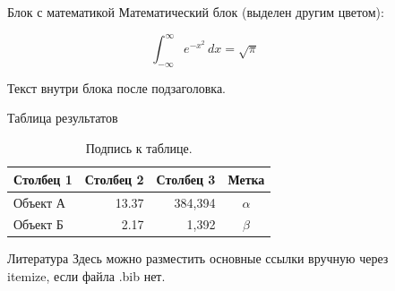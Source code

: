 \documentclass[final]{beamer}
\newlength{\sepwidth}
\newlength{\colwidth}
\newcommand{\separatorcolumn}{\begin{column}{\sepwidth}\end{column}}
\begin{document}
\begin{frame}[t]
\begin{columns}[t]
\begin{column}{\colwidth}
\end{column}

\separatorcolumn

\begin{column}{\colwidth}

  \begin{exampleblock}{Блок с математикой}
    Математический блок (выделен другим цветом):
    
    \[
    \int_{-\infty}^{\infty} e^{-x^2}\,dx = \sqrt{\pi}
    \]

    Текст внутри блока после подзаголовка.
  \end{exampleblock}

  \begin{block}{Таблица результатов}
    \begin{table}
      \centering
      \begin{tabular}{l r r c}
        \toprule
        \textbf{Столбец 1} & \textbf{Столбец 2} & \textbf{Столбец 3} & \textbf{Метка} \\
        \midrule
        Объект А & 13.37 & 384,394 & $\alpha$ \\
        Объект Б & 2.17 & 1,392 & $\beta$ \\
        \bottomrule
      \end{tabular}
      \caption{Подпись к таблице.}
    \end{table}
  \end{block}

  \begin{block}{Литература}
    Здесь можно разместить основные ссылки вручную через itemize, если файла .bib нет.
  \end{block}

\end{column}

\separatorcolumn
\end{columns}
\end{frame}
\end{document}
